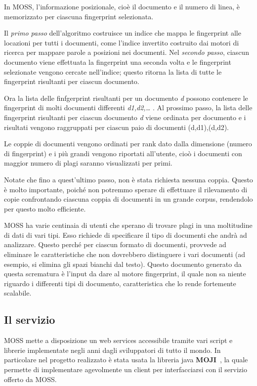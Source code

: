 			In MOSS, l'informazione posizionale, cioè il documento e il numero di linea, è memorizzato per ciascuna fingerprint selezionata. 
			
			Il \textit{primo passo} dell'algoritmo costruisce un indice che mappa le fingerprint alle locazioni per tutti i documenti, come l'indice invertito costruito dai motori di ricerca per mappare parole a posizioni nei documenti.
			Nel \textit{secondo passo}, ciascun documento viene effettuata la fingerprint una seconda volta e le fingerprint selezionate vengono cercate nell'indice; questo ritorna la lista di tutte le fingerprint risultanti per ciascun documento. 
			
			Ora la lista delle finfgerprint risultanti per un documento \textit{d} possono contenere le fingerprint di molti documenti differenti \textit{ d1,d2,… }.
			Al prossimo passo, la lista delle fingerprint risultanti per ciascun documento \textit{d} viene ordinata per documento e i risultati vengono raggruppati per ciascun paio di documenti (d,d1),(d,d2). 
			
			Le coppie di documenti vengono ordinati per rank dato dalla dimensione (numero di fingerprint) e i più grandi vengono riportati all'utente, cioò i documenti con maggior numero di plagi saranno visualizzati per primi. 
			
			Notate che fino a quest'ultimo passo, non è stata richiesta nessuna coppia. 
			Questo è molto importante, poiché non potremmo sperare di effettuare il rilevamento di copie confrontando ciascuna coppia di documenti in un grande corpus, rendendolo per questo molto efficiente.
	
			MOSS ha varie centinaia di utenti che sperano di trovare plagi in una moltitudine di dati di vari tipi. Esso richiede di specificare il tipo di documenti che andrà ad analizzare. Questo perché per ciascun formato di documenti, provvede ad eliminare le caratteristiche che non dovrebbero distinguere i vari documenti (ad esempio, si elimina gli spazi bianchi dal testo). 
			Questo documento generato da questa scrematura è l'input da dare al motore fingerprint, il quale non sa niente riguardo i differenti tipi di documento, caratteristica che lo rende fortemente scalabile.
			
		\subsection*{Il servizio}
			MOSS mette a disposizione un web services accessibile tramite vari script e librerie implementate negli anni dagli sviluppatori di tutto il mondo. In particolare nel progetto realizzato è stata usata la libreria java \textbf{MOJI}~\citep{MOJI}, la quale permette di implementare agevolmente un client per interfacciarsi con il servizio offerto da MOSS.
			
